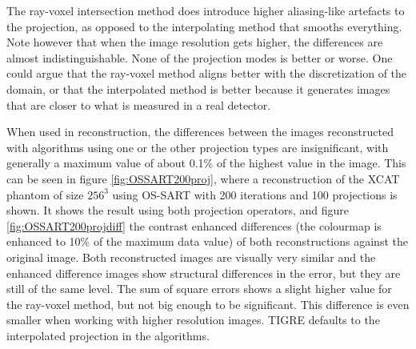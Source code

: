 The ray-voxel intersection method does introduce higher aliasing-like artefacts to the projection, as opposed to the interpolating method that smooths everything. Note however that when the image resolution gets higher, the differences are almost indistinguishable. None of the projection modes is better or worse. One could argue that the ray-voxel method aligns better with the discretization of the domain, or that the interpolated method is better because it generates images that are closer to what is measured in a real detector. 


When used in reconstruction, the differences between the images reconstructed with algorithms using one or the other projection types are insignificant, with generally a maximum value of about 0.1\% of the highest value in the image. This can be seen in figure \ref{fig:OSSART200proj}, where a reconstruction of the XCAT\cite{XCAT} phantom of size $256^3$ using OS-SART with 200 iterations and 100 projections is shown. It shows the result using both projection operators, and figure \ref{fig:OSSART200projdiff} the contrast enhanced differences (the colourmap is enhanced to 10\% of the maximum data value) of both reconstructions against the original image. Both reconstructed images are visually very similar and the enhanced difference images show structural differences in the error, but they are still of the same level. The sum of square errors shows a slight higher value for the ray-voxel method, but not big enough to be significant. This difference is even smaller when working with higher resolution images. TIGRE defaults to the interpolated projection in the algorithms.



